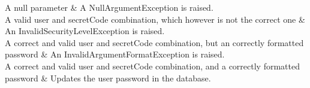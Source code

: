 \begin{testtable}
	A null parameter &
	A NullArgumentException is raised.\\\hline
	A valid user and secretCode combination, which however is not the correct one &
	An InvalidSecurityLevelException is raised. \\\hline
	A correct and valid user and secretCode combination, but an correctly formatted password &
	An InvalidArgumentFormatException is raised. \\\hline
	A correct and valid user and secretCode combination, and a correctly formatted password &
	Updates the user password in the database. \\\hline\hline
	

	
\end{testtable}

